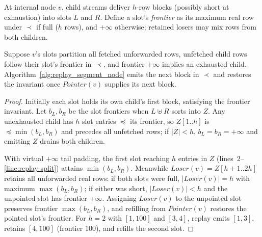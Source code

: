 At internal node $v$, child streams deliver $h$-row blocks (possibly short at exhaustion) into slots $L$ and $R$. Define a slot's \emph{frontier} as its maximum real row under $\prec$ if full ($h$ rows), and $+\infty$ otherwise; retained losers may mix rows from both children.

\begin{lemma}
\label{lem:lt-node}
Suppose $v$'s slots partition all fetched unforwarded rows, unfetched child rows follow their slot's frontier in $\prec$, and frontier $+\infty$ implies an exhausted child. Algorithm~\ref{alg:replay_segment_node} emits the next block in $\prec$ and restores the invariant once $\mathit{Pointer}(v)$ supplies its next block.
\end{lemma}
\begin{proof}
Initially each slot holds its own child's first block, satisfying the frontier invariant. Let $b_L, b_R$ be the slot frontiers when $L \uplus R$ sorts into $Z$. Any unexhausted child has $h$ slot entries $\preceq$ its frontier, so $Z[1..h]$ is $\preceq \min(b_L, b_R)$ and precedes all unfetched rows; if $|Z| < h$, $b_L = b_R = +\infty$ and emitting $Z$ drains both children.

With virtual $+\infty$ tail padding, the first slot reaching $h$ entries in $Z$ (lines~2--\ref{line:replay-split}) attains $\min(b_L, b_R)$. Meanwhile $\mathit{Loser}(v) = Z[h{+}1..2h]$ retains all unforwarded real rows: if both slots were full, $|\mathit{Loser}(v)| = h$ with maximum $\max(b_L, b_R)$; if either was short, $|\mathit{Loser}(v)| < h$ and the unpointed slot has frontier $+\infty$. Assigning $\mathit{Loser}(v)$ to the unpointed slot preserves frontier $\max(b_L, b_R)$, and refilling from $\mathit{Pointer}(v)$ restores the pointed slot's frontier. For $h{=}2$ with $[1,100]$ and $[3,4]$, replay emits $[1,3]$, retains $[4,100]$ (frontier $100$), and refills the second slot.
\end{proof}

